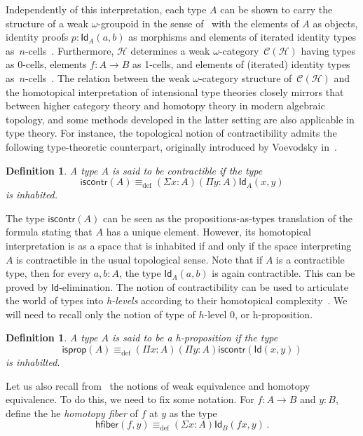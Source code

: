 \documentclass[reqno,10pt,a4paper,oneside]{amsart}
\numberwithin{equation}{section}
\theoremstyle{mythm}
\theoremstyle{mydef}
\newtheorem{definition}[theorem]{Definition}
\theoremstyle{myrmk}
\newcommand{\deq}{\equiv}
\newcommand{\defeq}{\deq_{\mathrm{def}}}
\newcommand{\Hint}{\mathcal{H}}
\newcommand{\iscontr}{\mathsf{iscontr}}
\newcommand{\isprop}{\mathsf{isprop}}
\newcommand{\hfiber}{\mathsf{hfiber}}
\newcommand{\Id}{\mathsf{Id}}
\newcommand{\id}[1]{\Id_{#1}}
\begin{document}
Independently of this interpretation, each type $A$ can be shown to carry the structure of a weak 
$\omega$-groupoid in the sense of~\cite{BataninM:mongcn,LeinsterT:higohc} with the elements of $A$ as objects, identity proofs $p : \id{A}(a,b)$ as morphisms and 
 elements of iterated identity types 
 as~$n$-cells~\cite{vandenBergB:typwg,LumsdaineP:weaci}. Furthermore, $\Hint$ 
 determines a weak $\omega$-category~$\mathcal{C}(\Hint)$ having types as 0-cells, elements $f : A \rightarrow B$ as 1-cells, and elements of (iterated) identity types 
as~$n$-cells~\cite{Lumsdaine:higcft}.   The relation between the weak $\omega$-category structure of~$\mathcal{C}(\Hint)$ and the homotopical interpretation of intensional type theories closely mirrors that between higher category theory and homotopy theory in modern algebraic topology, and some methods developed in the latter setting are also applicable in type theory.  For instance,
 the topological notion of contractibility admits the following type-theoretic counterpart, originally
 introduced by Voevodsky in~\cite{VoevodskyV:unifc}.


\begin{definition}  A type $A$ is said to be \emph{contractible} if the  type 
 \begin{equation}
 \label{eq:contractible}
\iscontr(A) \defeq (\Sigma x:A)(\Pi y:A)\id{A}(x,y)
\end{equation}
is inhabited.
\end{definition} 

The type $\iscontr(A)$ can be seen as the propositions-as-types translation
of the formula stating that $A$ has a unique element. However, its homotopical interpretation 
is as a space that is inhabited if and only if the space interpreting $A$ is contractible in the usual
topological sense. Note that if $A$ is a contractible type, then for every $a, b : A$, the type $\id{A}(a,b)$ is again contractible. 
This can be proved  by $\Id$-elimination. The notion of contractibility can be used to articulate the world of types  into \emph{h-levels} according to their
homotopical complexity~\cite{VoevodskyV:unifc}. We will need to recall only the notion of type of $h$-level 0, or h-proposition.

\begin{definition} A type $A$ is said to be a \emph{h-proposition} if the type
\[
\isprop(A) \defeq (\Pi x : A)(\Pi y : A) \iscontr( \Id(x,y)) 
\]
is inhabilted.
\end{definition}


Let us also recall from~\cite{VoevodskyV:unifc} the notions of weak equivalence and homotopy equivalence. To do this, we need to fix some notation. For $f : A \rightarrow B$ and $y : B$, define the he \emph{homotopy fiber} of $f$ at $y$ as the type
\[
 \hfiber(f,y) \defeq (\Sigma x : A) \id{B}(f x, y) \, .
\]
\end{document}
